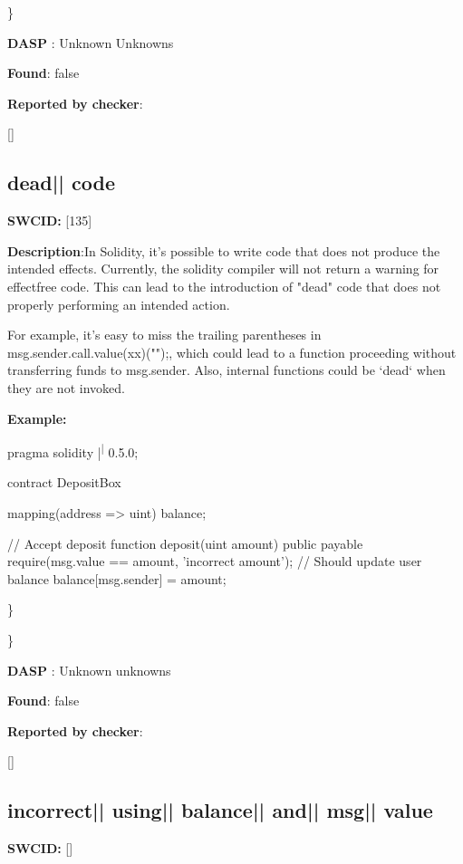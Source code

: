 \documentclass{article}
\begin{document}
\} 

\textbf{DASP} : Unknown Unknowns

\textbf{Found}: false

\textbf{Reported by checker}: 
\begin{ffcode} 

[]
\end{ffcode} 
\subsection{dead{|\textunderscore| }code} 
\textbf{SWC{\textunderscore }ID:} [135]

\textbf{Description}:In Solidity, it's possible to write code that does not produce the intended effects. Currently, the solidity compiler will not return a warning for effect{\textendash}free code. This can lead to the introduction of "dead" code that does not properly performing an intended action.

For example, it's easy to miss the trailing parentheses in msg.sender.call.value(xx)("");, which could lead to a function proceeding without transferring funds to msg.sender. Also, internal functions could be `dead` when they are not invoked.


\textbf{Example:} 
\begin{ffcode} 

pragma solidity |\textsuperscript| 0.5.0;

contract DepositBox {
    mapping(address => uint) balance;

    // Accept deposit
    function deposit(uint amount) public payable {
        require(msg.value == amount, 'incorrect amount');
        // Should update user balance
        balance[msg.sender] = amount;
    }
}

\end{ffcode} 
\} 

\} 

\textbf{DASP} : Unknown unknowns

\textbf{Found}: false

\textbf{Reported by checker}: 
\begin{ffcode} 

[]
\end{ffcode} 
\subsection{incorrect{|\textunderscore| }using{|\textunderscore| }balance{|\textunderscore| }and{|\textunderscore| }msg{|\textunderscore| }value} 
\textbf{SWC{\textunderscore }ID:} []
\end{document}
